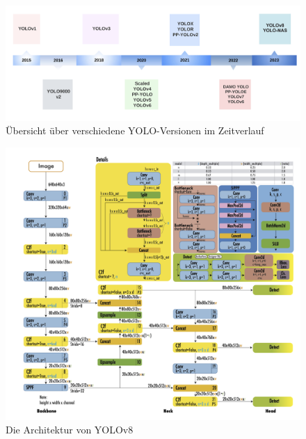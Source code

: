 {    
	
	

    \begin{figure}[h]
		\centering
		\includegraphics*[scale = 0.15, keepaspectratio]{images/YOLO/YOLO_timeline_vers.png}
		\caption[Übersicht über verschiedene YOLO Versionen im Zeitverlauf]{Übersicht über verschiedene YOLO-Versionen im Zeitverlauf \citep{Terven2023}}
		\label{YOLO_timeline_vers}
		\end{figure}

    \begin{figure}[h]
        \centering
        \includegraphics*[scale = 0.35, keepaspectratio]{images/YOLO/YOLOv8_Arch.png}
        \caption[Die Architektur von YOLOv8]{Die Architektur von YOLOv8 \citep{Terven2023}}
        \label{YOLOv8_Arch}
    \end{figure}
    \clearpage
}
